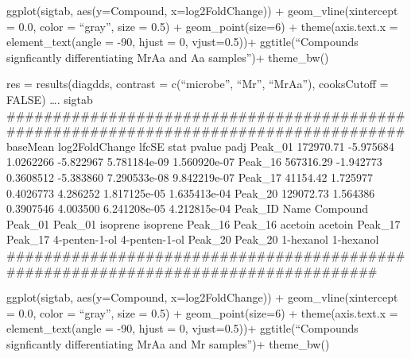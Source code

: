 \documentclass[]{article}
\begin{document}
ggplot(sigtab, aes(y=Compound, x=log2FoldChange)) +
geom\_vline(xintercept = 0.0, color = ``gray'', size = 0.5) +
geom\_point(size=6) + theme(axis.text.x = element\_text(angle = -90,
hjust = 0, vjust=0.5))+ ggtitle(``Compounds signficantly differentiating
MrAa and Aa samples'')+ theme\_bw()

res = results(diagdds, contrast = c(``microbe'', ``Mr'', ``MrAa''),
cooksCutoff = FALSE) \ldots{}. sigtab
\#\#\#\#\#\#\#\#\#\#\#\#\#\#\#\#\#\#\#\#\#\#\#\#\#\#\#\#\#\#\#\#\#\#\#\#\#\#\#\#\#\#\#\#\#\#\#\#\#\#\#\#\#\#\#\#\#\#\#\#\#\#\#\#\#\#\#\#\#\#\#\#\#\#\#\#\#\#\#\#\#\#\#\#\#\#
baseMean log2FoldChange lfcSE stat pvalue padj Peak\_01 172970.71
-5.975684 1.0262266 -5.822967 5.781184e-09 1.560920e-07 Peak\_16
567316.29 -1.942773 0.3608512 -5.383860 7.290533e-08 9.842219e-07
Peak\_17 41154.42 1.725977 0.4026773 4.286252 1.817125e-05 1.635413e-04
Peak\_20 129072.73 1.564386 0.3907546 4.003500 6.241208e-05 4.212815e-04
Peak\_ID Name Compound Peak\_01 Peak\_01 isoprene isoprene Peak\_16
Peak\_16 acetoin acetoin Peak\_17 Peak\_17 4-penten-1-ol 4-penten-1-ol
Peak\_20 Peak\_20 1-hexanol 1-hexanol
\#\#\#\#\#\#\#\#\#\#\#\#\#\#\#\#\#\#\#\#\#\#\#\#\#\#\#\#\#\#\#\#\#\#\#\#\#\#\#\#\#\#\#\#\#\#\#\#\#\#\#\#\#\#\#\#\#\#\#\#\#\#\#\#\#\#\#\#\#\#\#\#\#\#\#\#\#\#\#\#\#\#\#

ggplot(sigtab, aes(y=Compound, x=log2FoldChange)) +
geom\_vline(xintercept = 0.0, color = ``gray'', size = 0.5) +
geom\_point(size=6) + theme(axis.text.x = element\_text(angle = -90,
hjust = 0, vjust=0.5))+ ggtitle(``Compounds signficantly differentiating
MrAa and Mr samples'')+ theme\_bw()
\end{document}

